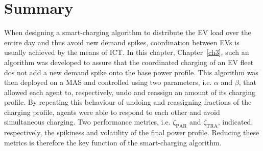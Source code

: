\section{Summary}
\label{ch3:sec:summary}

When designing a smart-charging algorithm to distribute the EV load over the entire day and thus avoid new demand spikes, coordination between EVs is usually achieved by the means of ICT.
In this chapter, Chapter~\ref{ch3}, such an algorithm was developed to assure that the coordinated charging of an EV fleet dos not add a new demand spike onto the base power profile.
This algorithm was then deployed on a MAS and controlled using two parameters, i.e. $\alpha$ and $\beta$, that allowed each agent to, respectively, undo and reassign an amount of its charging profile.
By repeating this behaviour of undoing and reassigning fractions of the charging profile, agents were able to respond to each other and avoid simultaneous charging.
Two performance metrics, i.e. $\zeta_\text{PAR}$ and $\zeta_\text{TRA}$, indicated, respectively, the spikiness and volatility of the final power profile.
Reducing these metrics is therefore the key function of the smart-charging algorithm.

